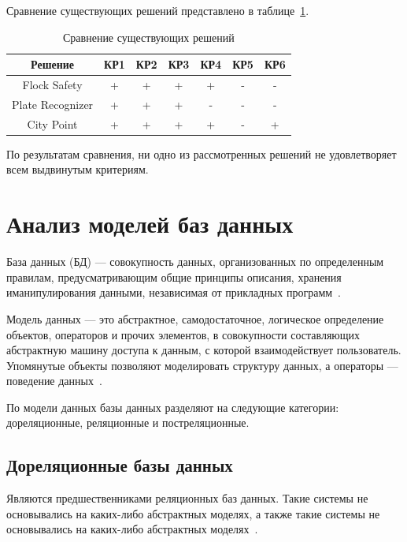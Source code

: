 Сравнение существующих решений представлено в таблице~\ref{tbl:entity}.

\begin{table}[H]
    \begin{center}
        \caption{Сравнение существующих решений}
        \begin{tabular}{|c|c|c|c|c|c|c|}
            \hline
            \textbf{Решение} & \textbf{КР1} & \textbf{КР2} & \textbf{КР3} & \textbf{КР4} & \textbf{КР5} & \textbf{КР6}\\
            \hline
            Flock Safety & + & + & + & + & - & - \\
            \hline
            Plate Recognizer & + & + & + & - & - & - \\
            \hline
            City Point & + & + & + & + & - & + \\
            \hline
        \end{tabular}
        \label{tbl:entity}
    \end{center}
\end{table}

По результатам сравнения, ни одно из рассмотренных решений не удовлетворяет всем выдвинутым критериям.

\section{Анализ моделей баз данных}

База данных (БД) --- совокупность данных, организованных по определенным правилам, предусматривающим общие принципы описания, хранения иманипулирования данными, независимая от прикладных программ~\cite{bd-def}.

Модель данных — это абстрактное, самодостаточное, логическое определение объектов, операторов и прочих элементов, в совокупности составляющих абстрактную машину доступа к данным, с которой взаимодействует пользователь. Упомянутые объекты позволяют моделировать структуру данных, а операторы — поведение данных~\cite{model-def}.

По модели данных базы данных разделяют на следующие категории:
дореляционные, реляционные и постреляционные.

\subsection{Дореляционные базы данных}

Являются предшественниками реляционных баз данных. Такие системы не основывались на каких-либо абстрактных моделях, а также такие системы не основывались на каких-либо абстрактных моделях~\cite{models}.

